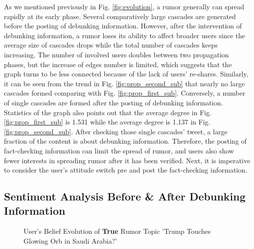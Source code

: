 \documentclass[conference]{IEEEtran}
\begin{document}
	As we mentioned previously in Fig. \ref{fig:evolution}, a rumor generally can spread rapidly at its early phase. Several comparatively large cascades are generated before the posting of debunking information. However, after the intervention of debunking information, a rumor loses its ability to affect broader users since the average size of cascades drops while the total number of cascades keeps increasing. The number of involved users doubles between two propagation phases, but the increase of edges number is limited, which suggests that the graph turns to be less connected because of the lack of users' re-shares. Similarly, it can be seen from the trend in Fig. \ref{fig:prop_second_sub} that nearly no large cascades formed comparing with Fig. \ref{fig:prop_first_sub}. Conversely, a number of single cascades are formed after the posting of debunking information. Statistics of the graph also points out that the average degree in Fig. \ref{fig:prop_first_sub} is 1.531 while the average degree is 1.137 in Fig. \ref{fig:prop_second_sub}. After checking those single cascades' tweet, a large fraction of the content is about debunking information. Therefore, the posting of fact-checking information can limit the spread of rumor, and users also show fewer interests in spreading rumor after it has been verified. Next, it is imperative to consider the user's attitude switch pre and post the fact-checking information. 
	
	
	\subsection{Sentiment Analysis Before \& After Debunking Information}
	
	\begin{figure}[htp]
		\centering
		\caption{User's Belief Evolution of \textbf{True} Rumor Topic 'Trump Touches Glowing Orb in Saudi Arabia?'}
		\label{fig:attitude_A}
	\end{figure}
	
\end{document}
